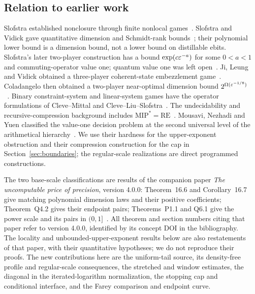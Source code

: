 \subsection{Relation to earlier work}
Slofstra established nonclosure through finite nonlocal games~\cite{Slofstra}. Slofstra and Vidick gave quantitative dimension and Schmidt-rank bounds~\cite{SV}; their polynomial lower bound is a dimension bound, not a lower bound on distillable ebits. Slofstra's later two-player construction has a bound $\exp(c\varepsilon^{-a})$ for some $0<a<1$ and commuting-operator value one; quantum value one was left open~\cite[Corollary 1.4]{SlofstraProfile}. Ji, Leung and Vidick obtained a three-player coherent-state embezzlement game~\cite{JLV}. Coladangelo then obtained a two-player near-optimal dimension bound $2^{\Omega(\varepsilon^{-1/8})}$~\cite{Col2020}. Binary constraint-system and linear-system games have the operator formulations of Cleve--Mittal and Cleve--Liu--Slofstra~\cite{CM,CLS}. The undecidability and recursive-compression background includes $\mathrm{MIP}^*=\mathrm{RE}$~\cite{MIPRE}. Mousavi, Nezhadi and Yuen classified the value-one decision problem at the second universal level of the arithmetical hierarchy~\cite{MNY}. We use their hardness for the upper-exponent obstruction and their compression construction for the cap in Section~\ref{sec:boundaries}; the regular-scale realizations are direct programmed constructions.

The two base-scale classifications are results of the companion paper \emph{The uncomputable price of precision}, version 4.0.0: Theorem~16.6 and Corollary~16.7 give matching polynomial dimension laws and their positive coefficients; Theorem~Q4.2 gives their endpoint pairs; Theorems~P1.1 and Q6.1 give the power scale and its pairs in $(0,1]$~\cite{UP}. All theorem and section numbers citing that paper refer to version 4.0.0, identified by its concept DOI in the bibliography. The locality and unbounded-upper-exponent results below are also restatements of that paper, with their quantitative hypotheses; we do not reproduce their proofs. The new contributions here are the uniform-tail source, its density-free profile and regular-scale consequences, the stretched and window estimates, the diagonal in the iterated-logarithm normalization, the stopping cap and conditional interface, and the Farey comparison and endpoint curve.

